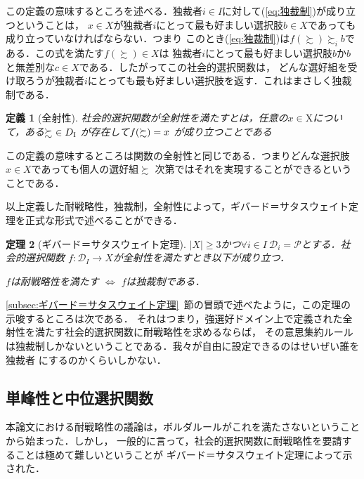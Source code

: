 \documentclass[dvipdfmx]{jsarticle}
\newtheorem{definition}{定義}[section]
\newtheorem{theorem}[definition]{定理}
\begin{document}
この定義の意味するところを述べる．独裁者$i \in I$に対して(\ref{eq:独裁制})が成り立つということは，
$x \in X$が独裁者$i$にとって最も好ましい選択肢$b \in X$であっても成り立っていなければならない．つまり
このとき(\ref{eq:独裁制})は$f(\succsim) \succsim_i b$である．この式を満たす$f(\succsim) \in X$は
独裁者$i$にとって最も好ましい選択肢$b$か$b$と無差別な$c \in X$である．したがってこの社会的選択関数は，
どんな選好組を受け取ろうが独裁者$i$にとっても最も好ましい選択肢を返す．これはまさしく独裁制である．


\begin{definition}[全射性]
  社会的選択関数が全射性を満たすとは，任意の$x \in \mathrm{X}$について，ある$\succsim \ \in \mathnormal{D}_{\mathrm{I}}$
  が存在して$\mathnormal{f}(\succsim) = x$
  が成り立つことである
\end{definition}

この定義の意味するところは関数の全射性と同じである．つまりどんな選択肢$x \in X$であっても個人の選好組$\succsim$
次第ではそれを実現することができるということである．

以上定義した耐戦略性，独裁制，全射性によって，ギバード＝サタスウェイト定理を正式な形式で述べることができる．

\begin{theorem}[ギバード＝サタスウェイト定理]\label{thm:ギバード＝サタスウェイト定理}
  $|X| \geq 3$かつ$\forall i \in I \ \mathcal{D}_i = \mathcal{P}$とする．社会的選択関数
  $f\colon \mathcal{D}_{I} \to X$が全射性を満たすとき以下が成り立つ．
  \begin{center}
    $f$は耐戦略性を満たす $\Leftrightarrow$ $f$は独裁制である．
  \end{center}
\end{theorem}

\ref{subsec:ギバード＝サタスウェイト定理}~節の冒頭で述べたように，この定理の示唆するところは次である．
それはつまり，強選好ドメイン上で定義された全射性を満たす社会的選択関数に耐戦略性を求めるならば，
その意思集約ルールは独裁制しかないということである．我々が自由に設定できるのはせいぜい誰を独裁者
にするのかくらいしかない．


\subsection{単峰性と中位選択関数}\label{subsec:単峰性と中位選択関数}
本論文における耐戦略性の議論は，ボルダルールがこれを満たさないということから始まった．しかし，
一般的に言って，社会的選択関数に耐戦略性を要請することは極めて難しいということが
ギバード＝サタスウェイト定理によって示された．
\end{document}
